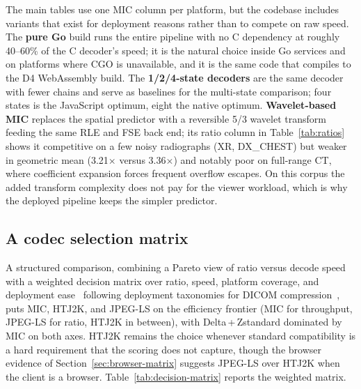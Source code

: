 \documentclass[journal]{IEEEtran}
\begin{document}
The main tables use one MIC column per platform, but the codebase includes
variants that exist for deployment reasons rather than to compete on raw
speed. The \textbf{pure Go} build runs the entire pipeline with no C
dependency at roughly 40--60\% of the C decoder's speed; it is the natural
choice inside Go services and on platforms where CGO is unavailable, and it
is the same code that compiles to the D4 WebAssembly build. The
\textbf{1/2/4-state decoders} are the same decoder with fewer chains and
serve as baselines for the multi-state comparison; four states is the
JavaScript optimum, eight the native optimum. \textbf{Wavelet-based MIC}
replaces the spatial predictor with a reversible 5/3 wavelet
transform~\cite{legall1988} feeding the same RLE and FSE back end; its ratio
column in Table~\ref{tab:ratios} shows it competitive on a few
noisy radiographs (XR, DX\_CHEST) but weaker in geometric mean
(3.21$\times$ versus 3.36$\times$) and notably poor on full-range CT, where
coefficient expansion forces frequent overflow escapes. On this corpus the
added transform complexity does not pay for the viewer workload, which is
why the deployed pipeline keeps the simpler predictor.

\subsection{A codec selection matrix}

A structured comparison, combining a Pareto view of ratio versus decode
speed~\cite{geldreich_pareto,jpegxl_pareto} with a weighted decision matrix
over ratio, speed, platform coverage, and deployment
ease~\cite{saaty_ahp,sayood} following deployment taxonomies for DICOM
compression~\cite{clunie_miit2009,liu2017}, puts MIC, HTJ2K, and JPEG-LS on
the efficiency frontier (MIC for throughput, JPEG-LS for ratio, HTJ2K in
between), with Delta\,+\,Zstandard dominated by MIC on both axes. HTJ2K
remains the choice whenever standard compatibility is a hard requirement
that the scoring does not capture, though the browser evidence of
Section~\ref{sec:browser-matrix} suggests JPEG-LS over HTJ2K when the
client is a browser. Table~\ref{tab:decision-matrix} reports the weighted
matrix.
\end{document}
